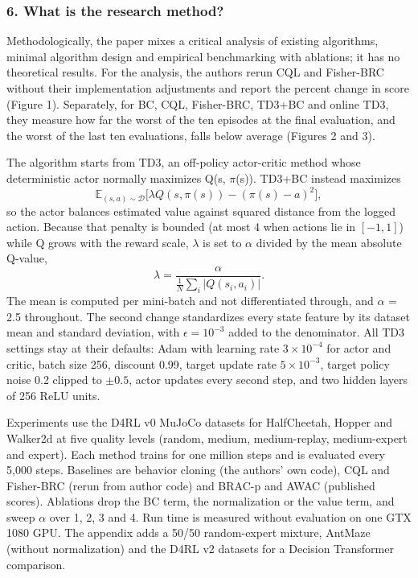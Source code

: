 \documentclass[11pt]{article}
\newcommand{\question}[1]{\subsubsection*{#1}}
\begin{document}
\question{6. What is the research method?}

Methodologically, the paper mixes a critical analysis of existing algorithms, minimal algorithm design and empirical benchmarking with ablations; it has no theoretical results. For the analysis, the authors rerun CQL and Fisher-BRC without their implementation adjustments and report the percent change in score (Figure 1). Separately, for BC, CQL, Fisher-BRC, TD3+BC and online TD3, they measure how far the worst of the ten episodes at the final evaluation, and the worst of the last ten evaluations, falls below average (Figures 2 and 3).

The algorithm starts from TD3, an off-policy actor-critic method whose deterministic actor normally maximizes Q(s, \ensuremath{\pi}(s)). TD3+BC instead maximizes \begin{equation*}\mathbb{E}_{(s,a)\sim\mathcal{D}}\big[\lambda Q(s,\pi(s))-(\pi(s)-a)^{2}\big],\end{equation*} so the actor balances estimated value against squared distance from the logged action. Because that penalty is bounded (at most 4 when actions lie in $[-1,1]$) while Q grows with the reward scale, \ensuremath{\lambda} is set to \ensuremath{\alpha} divided by the mean absolute Q-value, \begin{equation*}\lambda=\frac{\alpha}{\frac{1}{N}\sum_{i}\lvert Q(s_i,a_i)\rvert}.\end{equation*} The mean is computed per mini-batch and not differentiated through, and \ensuremath{\alpha} = 2.5 throughout. The second change standardizes every state feature by its dataset mean and standard deviation, with $\epsilon=10^{-3}$ added to the denominator. All TD3 settings stay at their defaults: Adam with learning rate $3\times10^{-4}$ for actor and critic, batch size 256, discount 0.99, target update rate $5\times10^{-3}$, target policy noise 0.2 clipped to $\pm 0.5$, actor updates every second step, and two hidden layers of 256 ReLU units.

Experiments use the D4RL v0 MuJoCo datasets for HalfCheetah, Hopper and Walker2d at five quality levels (random, medium, medium-replay, medium-expert and expert). Each method trains for one million steps and is evaluated every 5,000 steps. Baselines are behavior cloning (the authors' own code), CQL and Fisher-BRC (rerun from author code) and BRAC-p and AWAC (published scores). Ablations drop the BC term, the normalization or the value term, and sweep \ensuremath{\alpha} over 1, 2, 3 and 4. Run time is measured without evaluation on one GTX 1080 GPU. The appendix adds a 50/50 random-expert mixture, AntMaze (without normalization) and the D4RL v2 datasets for a Decision Transformer comparison.
\end{document}
